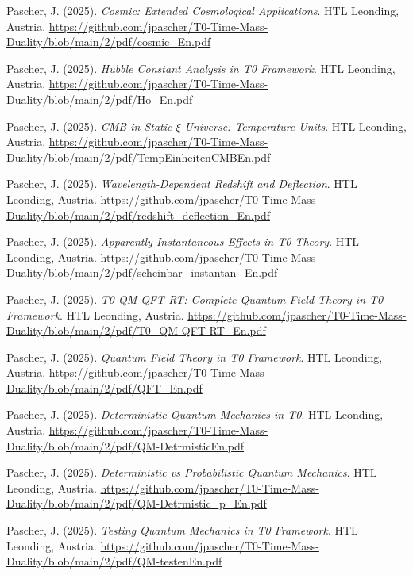 \documentclass{article}
\begin{document}
\begin{thebibliography}{99}
		Pascher, J. (2025).
		\textit{Cosmic: Extended Cosmological Applications}.
		HTL Leonding, Austria.
		\url{https://github.com/jpascher/T0-Time-Mass-Duality/blob/main/2/pdf/cosmic_En.pdf}
		
		Pascher, J. (2025).
		\textit{Hubble Constant Analysis in T0 Framework}.
		HTL Leonding, Austria.
		\url{https://github.com/jpascher/T0-Time-Mass-Duality/blob/main/2/pdf/Ho_En.pdf}
		
		Pascher, J. (2025).
		\textit{CMB in Static $\xi$-Universe: Temperature Units}.
		HTL Leonding, Austria.
		\url{https://github.com/jpascher/T0-Time-Mass-Duality/blob/main/2/pdf/TempEinheitenCMBEn.pdf}
		
		Pascher, J. (2025).
		\textit{Wavelength-Dependent Redshift and Deflection}.
		HTL Leonding, Austria.
		\url{https://github.com/jpascher/T0-Time-Mass-Duality/blob/main/2/pdf/redshift_deflection_En.pdf}
		
		Pascher, J. (2025).
		\textit{Apparently Instantaneous Effects in T0 Theory}.
		HTL Leonding, Austria.
		\url{https://github.com/jpascher/T0-Time-Mass-Duality/blob/main/2/pdf/scheinbar_instantan_En.pdf}
		
		
		Pascher, J. (2025).
		\textit{T0 QM-QFT-RT: Complete Quantum Field Theory in T0 Framework}.
		HTL Leonding, Austria.
		\url{https://github.com/jpascher/T0-Time-Mass-Duality/blob/main/2/pdf/T0_QM-QFT-RT_En.pdf}
		
		Pascher, J. (2025).
		\textit{Quantum Field Theory in T0 Framework}.
		HTL Leonding, Austria.
		\url{https://github.com/jpascher/T0-Time-Mass-Duality/blob/main/2/pdf/QFT_En.pdf}
		
		Pascher, J. (2025).
		\textit{Deterministic Quantum Mechanics in T0}.
		HTL Leonding, Austria.
		\url{https://github.com/jpascher/T0-Time-Mass-Duality/blob/main/2/pdf/QM-DetrmisticEn.pdf}
		
		Pascher, J. (2025).
		\textit{Deterministic vs Probabilistic Quantum Mechanics}.
		HTL Leonding, Austria.
		\url{https://github.com/jpascher/T0-Time-Mass-Duality/blob/main/2/pdf/QM-Detrmistic_p_En.pdf}
		
		Pascher, J. (2025).
		\textit{Testing Quantum Mechanics in T0 Framework}.
		HTL Leonding, Austria.
		\url{https://github.com/jpascher/T0-Time-Mass-Duality/blob/main/2/pdf/QM-testenEn.pdf}
		

\end{thebibliography}
\end{document}
